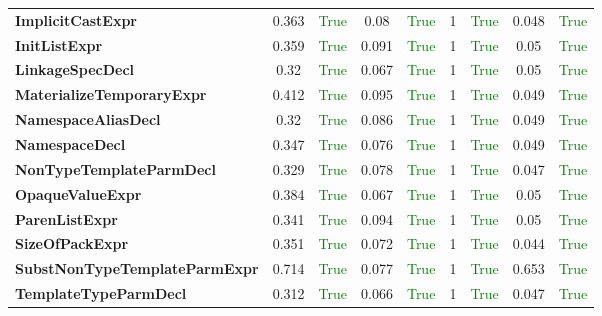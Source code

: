 \documentclass{article}
\begin{document}
\begin{xltabular}{\textwidth}{lcccccccc}
\textbf{{\fontsize{10}{12}\selectfont ImplicitCastExpr}}& 0.363&\textcolor{green}{True}& 0.08&\textcolor{green}{True}& 1&\textcolor{green}{True}& 0.048&\textcolor{green}{True} \\[0.5ex]
\textbf{{\fontsize{10}{12}\selectfont InitListExpr}}& 0.359&\textcolor{green}{True}& 0.091&\textcolor{green}{True}& 1&\textcolor{green}{True}& 0.05&\textcolor{green}{True} \\[0.5ex]
\textbf{{\fontsize{10}{12}\selectfont LinkageSpecDecl}}& 0.32&\textcolor{green}{True}& 0.067&\textcolor{green}{True}& 1&\textcolor{green}{True}& 0.05&\textcolor{green}{True} \\[0.5ex]
\textbf{{\fontsize{10}{12}\selectfont MaterializeTemporaryExpr}}& 0.412&\textcolor{green}{True}& 0.095&\textcolor{green}{True}& 1&\textcolor{green}{True}& 0.049&\textcolor{green}{True} \\[0.5ex]
\textbf{{\fontsize{10}{12}\selectfont NamespaceAliasDecl}}& 0.32&\textcolor{green}{True}& 0.086&\textcolor{green}{True}& 1&\textcolor{green}{True}& 0.049&\textcolor{green}{True} \\[0.5ex]
\textbf{{\fontsize{10}{12}\selectfont NamespaceDecl}}& 0.347&\textcolor{green}{True}& 0.076&\textcolor{green}{True}& 1&\textcolor{green}{True}& 0.049&\textcolor{green}{True} \\[0.5ex]
\textbf{{\fontsize{10}{12}\selectfont NonTypeTemplateParmDecl}}& 0.329&\textcolor{green}{True}& 0.078&\textcolor{green}{True}& 1&\textcolor{green}{True}& 0.047&\textcolor{green}{True} \\[0.5ex]
\textbf{{\fontsize{10}{12}\selectfont OpaqueValueExpr}}& 0.384&\textcolor{green}{True}& 0.067&\textcolor{green}{True}& 1&\textcolor{green}{True}& 0.05&\textcolor{green}{True} \\[0.5ex]
\textbf{{\fontsize{10}{12}\selectfont ParenListExpr}}& 0.341&\textcolor{green}{True}& 0.094&\textcolor{green}{True}& 1&\textcolor{green}{True}& 0.05&\textcolor{green}{True} \\[0.5ex]
\textbf{{\fontsize{10}{12}\selectfont SizeOfPackExpr}}& 0.351&\textcolor{green}{True}& 0.072&\textcolor{green}{True}& 1&\textcolor{green}{True}& 0.044&\textcolor{green}{True} \\[0.5ex]
\textbf{{\fontsize{10}{12}\selectfont SubstNonTypeTemplateParmExpr}}& 0.714&\textcolor{green}{True}& 0.077&\textcolor{green}{True}& 1&\textcolor{green}{True}& 0.653&\textcolor{green}{True} \\[0.5ex]
\textbf{{\fontsize{10}{12}\selectfont TemplateTypeParmDecl}}& 0.312&\textcolor{green}{True}& 0.066&\textcolor{green}{True}& 1&\textcolor{green}{True}& 0.047&\textcolor{green}{True} \\[0.5ex]

\end{xltabular}
\end{document}
